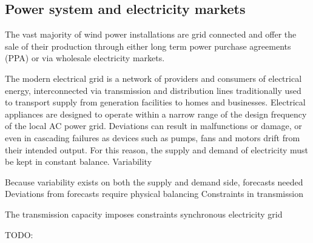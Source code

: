 \clearpage
\subsection{Power system and electricity markets}
\label{sec:intro_power_markets}

The vast majority of wind power installations are grid connected and offer the sale of their production through either long term power purchase agreements (PPA) or via wholesale electricity markets.

The modern electrical grid is a network of providers and consumers of electrical energy, interconnected via transmission and distribution lines traditionally used to transport supply from generation facilities to homes and businesses. Electrical appliances are designed to operate within a narrow range of the design frequency of the local AC power grid. Deviations can result in malfunctions or damage, or even in cascading failures as devices such as pumps, fans and motors drift from their intended output. For this reason, the supply and demand of electricity must be kept in constant balance. Variability 


Because variability exists on both the supply and demand side, forecasts needed
Deviations from forecasts require physical balancing
Constraints in transmission






The transmission capacity imposes constraints 
synchronous electricity grid 


TODO:

